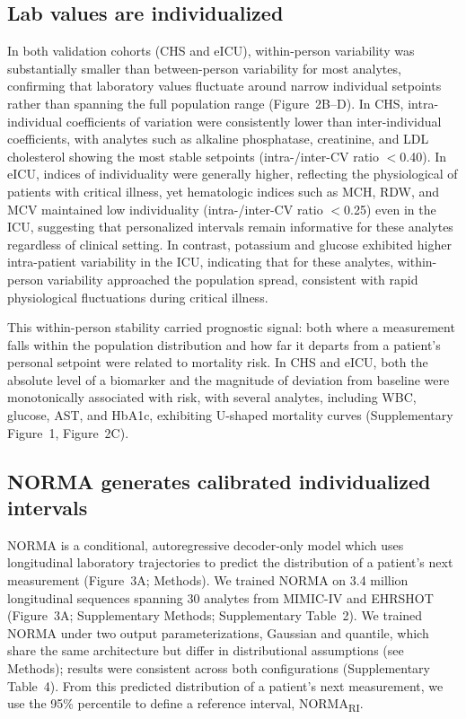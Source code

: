 \documentclass[11pt]{article}
\begin{document}
\subsection*{Lab values are individualized}

In both validation cohorts (CHS and eICU), within-person variability was substantially smaller than between-person variability for most analytes, confirming that laboratory values fluctuate around narrow individual setpoints rather than spanning the full population range (Figure~2B--D). In CHS, intra-individual coefficients of variation were consistently lower than inter-individual coefficients, with analytes such as alkaline phosphatase, creatinine, and LDL cholesterol showing the most stable setpoints (intra-/inter-CV ratio $<$0.40). In eICU, indices of individuality were generally higher, reflecting the physiological of patients with critical illness, yet hematologic indices such as MCH, RDW, and MCV maintained low individuality (intra-/inter-CV ratio $<$0.25) even in the ICU, suggesting that personalized intervals remain informative for these analytes regardless of clinical setting. In contrast, potassium and glucose exhibited higher intra-patient variability in the ICU, indicating that for these analytes, within-person variability approached the population spread, consistent with rapid physiological fluctuations during critical illness.

This within-person stability carried prognostic signal: both where a measurement falls within the population distribution and how far it departs from a patient's personal setpoint were related to mortality risk. In CHS and eICU, both the absolute level of a biomarker and the magnitude of deviation from baseline were monotonically associated with risk, with several analytes, including WBC, glucose, AST, and HbA1c, exhibiting U-shaped mortality curves (Supplementary Figure~1, Figure~2C).

\subsection*{NORMA generates calibrated individualized intervals}

NORMA is a conditional, autoregressive decoder-only model which uses longitudinal laboratory trajectories to predict the distribution of a patient's next measurement (Figure~3A; Methods). We trained NORMA on 3.4 million longitudinal sequences spanning 30 analytes from MIMIC-IV and EHRSHOT (Figure~3A; Supplementary Methods; Supplementary Table~2). We trained NORMA under two output parameterizations, Gaussian and quantile, which share the same architecture but differ in distributional assumptions (see Methods); results were consistent across both configurations (Supplementary Table~4). From this predicted distribution of a patient's next measurement, we use the 95\% percentile to define a reference interval, NORMA\textsubscript{RI}.
\end{document}
